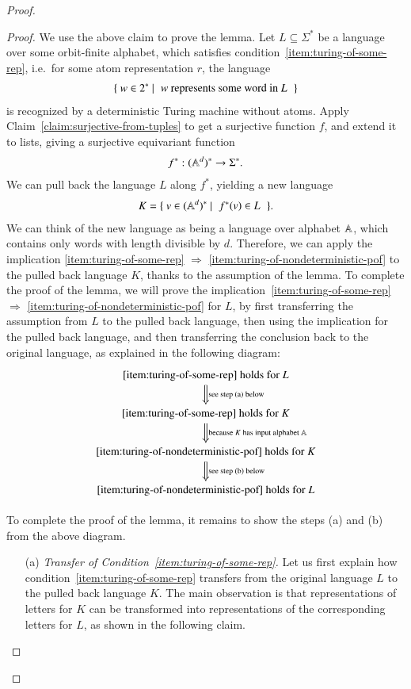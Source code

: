 \begin{proof}
\begin{proof}
		We use the above claim to prove the lemma. 
		Let  $L \subseteq \Sigma^*$ be a language over some orbit-finite alphabet, which satisfies condition~\ref{item:turing-of-some-rep}, i.e.~for some atom representation $r$, the language 
		\begin{align*}
		\setbuild{ w \in 2^*}{ $w$ represents some word in $L$}
		\end{align*}
		is recognized by a deterministic Turing machine without atoms.
		Apply Claim~\ref{claim:surjective-from-tuples} to get a surjective function $f$, and  extend it to lists, giving a  surjective equivariant function  
		\begin{align*}
		f^* : (\mathbb A^d)^* \to \Sigma^*.
		\end{align*}
		We can pull back the language $L$ along $f^*$, yielding a new language 
		\begin{align*}
			K = \setbuild{ v \in (\atoms^d)^* }{$f^*(v) \in L$}.
			\end{align*}
		We can think of the new language as being a language over alphabet $\mathbb A$, which contains only words with length divisible by $d$.  Therefore, we can apply the implication \ref{item:turing-of-some-rep} $\Rightarrow$ \ref{item:turing-of-nondeterministic-pof} to the pulled back language $K$, thanks to the assumption of the lemma. To complete the proof of the lemma, we will prove the implication~\ref{item:turing-of-some-rep} $\Rightarrow$ \ref{item:turing-of-nondeterministic-pof} for  $L$, by first transferring the assumption from $L$ to the pulled back language, then using the implication for the pulled back language, and then transferring the conclusion back to the original language, as explained in the following diagram:
		\[
		\begin{tikzcd}
		\text{\ref{item:turing-of-some-rep}  holds for $L$} 
		\ar[d,Rightarrow,"\text{see step (a) below}"] \\
		\text{\ref{item:turing-of-some-rep}  holds for $K$}
		\ar[d,Rightarrow,"\text{because $K$ has input alphabet $\atoms$}"] \\
		\text{\ref{item:turing-of-nondeterministic-pof} holds for $K$}
		\ar[d,Rightarrow,"\text{see step (b) below}"] \\
		\text{\ref{item:turing-of-nondeterministic-pof} holds for $L$}
		\end{tikzcd}
		\]

		To complete the proof of the lemma, it remains to show the steps (a) and (b) from the above diagram.
		\begin{itemize}
			\item[(a)] \emph{Transfer of Condition~\ref{item:turing-of-some-rep}.} 		Let us first explain how condition~\ref{item:turing-of-some-rep} transfers from the original language $L$ to the pulled back language $K$.   The main observation is that representations of letters for $K$ can be transformed into representations of the corresponding letters for $L$, as shown in the following claim.
		

\end{itemize}
\end{proof}
\end{proof}
